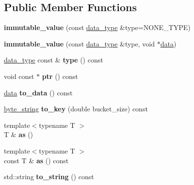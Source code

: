 \subsection*{Public Member Functions}
\begin{DoxyCompactItemize}
\item 
\mbox{\label{classdialog_1_1immutable__value_a972b2413bb2d99fce071c27416643c42}} 
{\bfseries immutable\+\_\+value} (const \hyperlink{structdialog_1_1data__type}{data\+\_\+type} \&type=N\+O\+N\+E\+\_\+\+T\+Y\+PE)
\item 
\mbox{\label{classdialog_1_1immutable__value_ac0e278c2e032926ba8ebd566b912d8f0}} 
{\bfseries immutable\+\_\+value} (const \hyperlink{structdialog_1_1data__type}{data\+\_\+type} \&type, void $\ast$\hyperlink{structdialog_1_1data}{data})
\item 
\mbox{\label{classdialog_1_1immutable__value_a3e5010e30ba626c00215f1a79f72ad43}} 
\hyperlink{structdialog_1_1data__type}{data\+\_\+type} const  \& {\bfseries type} () const
\item 
\mbox{\label{classdialog_1_1immutable__value_a2dd1b9b67daf4b11e6fb65e1c472c92c}} 
void const  $\ast$ {\bfseries ptr} () const
\item 
\mbox{\label{classdialog_1_1immutable__value_a73ff415d17fe3996ab17c58545fe677d}} 
\hyperlink{structdialog_1_1data}{data} {\bfseries to\+\_\+data} () const
\item 
\mbox{\label{classdialog_1_1immutable__value_abb8848484b3c749cfc87a5fcb80363d1}} 
\hyperlink{classdialog_1_1byte__string}{byte\+\_\+string} {\bfseries to\+\_\+key} (double bucket\+\_\+size) const
\item 
\mbox{\label{classdialog_1_1immutable__value_ab3506fae357c8e821208377e4233a94c}} 
{\footnotesize template$<$typename T $>$ }\\T \& {\bfseries as} ()
\item 
\mbox{\label{classdialog_1_1immutable__value_a8b80afca630d29dce85d7bdf4b110ad0}} 
{\footnotesize template$<$typename T $>$ }\\const T \& {\bfseries as} () const
\item 
\mbox{\label{classdialog_1_1immutable__value_abe03c6311a5ff089ce8689efb954dd49}} 
std\+::string {\bfseries to\+\_\+string} () const
\end{DoxyCompactItemize}
